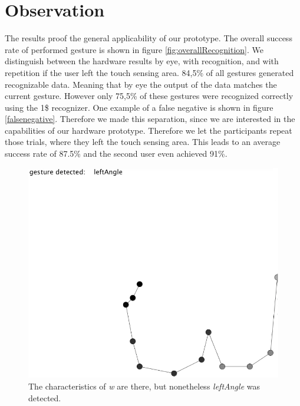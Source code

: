 \section{Observation}
The results proof the general applicability of our prototype. The overall success rate of performed gesture is shown in figure \ref{fig:overallRecognition}. We distinguish between the hardware results by eye, with recognition, and with repetition if the user left the touch sensing area. 84,5\% of all gestures generated recognizable data. Meaning that by eye the output of the data matches the current gesture. However only 75,5\% of these gestures were recognized correctly using the 1\$ recognizer.  One example of a false negative is shown in figure \ref{falsenegative}. Therefore we made this separation, since we are interested in the capabilities of our hardware prototype. Therefore we let the participants repeat those trials, where they  left the touch sensing area. This leads to an average success rate of 87.5\% and the second user even achieved 91\%.
\begin{figure}
\includegraphics[scale=0.35]{images/falsenegative.jpg}
\caption{The characteristics of \emph{w} are there, but nonetheless \emph{leftAngle} was detected.}
\label{fig:falsenegative}
\end{figure}
